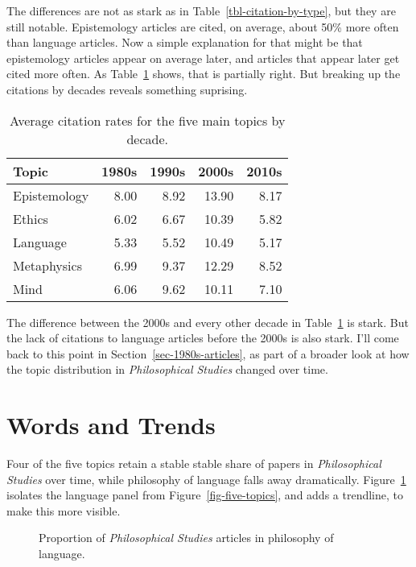 \documentclass[
  10pt,
  letterpaper,
  DIV=11,
  numbers=noendperiod,
  twoside]{scrartcl}
\begin{document}
The differences are not as stark as in Table~\ref{tbl-citation-by-type},
but they are still notable. Epistemology articles are cited, on average,
about 50\% more often than language articles. Now a simple explanation
for that might be that epistemology articles appear on average later,
and articles that appear later get cited more often. As
Table~\ref{tbl-topics-cites-decades} shows, that is partially right. But
breaking up the citations by decades reveals something suprising.

\begin{longtable}[]{@{}lrrrr@{}}

\caption{\label{tbl-topics-cites-decades}Average citation rates for the
five main topics by decade.}

\tabularnewline

\toprule\noalign{}
Topic & 1980s & 1990s & 2000s & 2010s \\
\midrule\noalign{}
\endhead
\bottomrule\noalign{}
\endlastfoot
Epistemology & 8.00 & 8.92 & 13.90 & 8.17 \\
Ethics & 6.02 & 6.67 & 10.39 & 5.82 \\
Language & 5.33 & 5.52 & 10.49 & 5.17 \\
Metaphysics & 6.99 & 9.37 & 12.29 & 8.52 \\
Mind & 6.06 & 9.62 & 10.11 & 7.10 \\

\end{longtable}

The difference between the 2000s and every other decade in
Table~\ref{tbl-topics-cites-decades} is stark. But the lack of citations
to language articles before the 2000s is also stark. I'll come back to
this point in Section~\ref{sec-1980s-articles}, as part of a broader
look at how the topic distribution in \emph{Philosophical Studies}
changed over time.

\section{Words and Trends}\label{sec-words-and-trends}

Four of the five topics retain a stable stable share of papers in
\emph{Philosophical Studies} over time, while philosophy of language
falls away dramatically. Figure~\ref{fig-language} isolates the language
panel from Figure~\ref{fig-five-topics}, and adds a trendline, to make
this more visible.

\begin{figure}


\caption{\label{fig-language}Proportion of \emph{Philosophical Studies}
articles in philosophy of language.}

\end{figure}%
\end{document}
